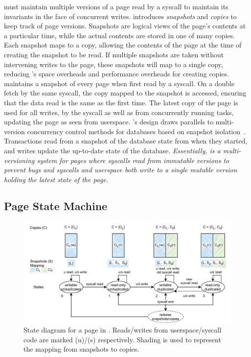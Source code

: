 \documentclass[letterpaper,twocolumn,10pt, anonymous]{article}
\begin{document}
\tiktok must maintain multiple versions of a page read by a syscall 
to maintain its invariants in the face of concurrent writes.
\tiktok introduces \emph{snapshots} and \emph{copies} to keep track 
of page versions. 
Snapshots are logical views of the page's contents at a particular time,
while the actual contents are stored in one of many copies. 
Each snapshot maps to a copy, allowing the contents of the page at the 
time of creating the snapshot to be read. 
If multiple snapshots are taken without intervening writes to the page, 
these snapshots will map to a single copy, reducing \tiktok's space overheads 
and performance overheads for creating copies.
\tiktok maintains a snapshot of every page when first read by a syscall.
On a double fetch by the same syscall, the copy mapped to the snapshot 
is accessed, ensuring that the data read is the same as the first time.
The latest copy of the page is used for all writes, by the syscall as 
well as from concurrently running tasks, updating the page as seen 
from userspace.
%
\tiktok's design draws parallels to multi-version concurrency control 
methods for databases based on snapshot isolation~\cite{0001MK15}.
Transactions read from a snapshot of the database state from when 
they started, and writes update the up-to-date state of the database.
%
\emph{Essentially, \tiktok is a multi-versioning system for pages where 
syscalls read from immutable versions to prevent \tocttou bugs and
syscalls and userspace both write to a single mutable version 
holding the latest state of the page.}

\subsection{Page State Machine}

\begin{figure}[]
  \centering
  \includegraphics[width=0.9\linewidth]{img/tiktok_states.pdf}
  \caption{State diagram for a page in \tiktok. Reads/writes from userspace/syscall 
          code are marked (u)/(s) respectively. Shading is used to represent the 
          mapping from snapshots to copies.}
  \label{fig:tiktok_states}
\end{figure}
\end{document}
